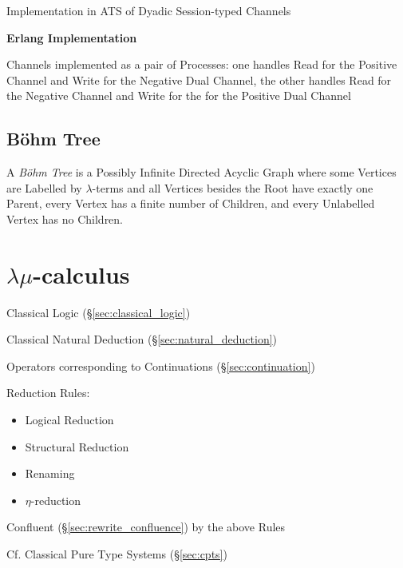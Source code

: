 Implementation in ATS of Dyadic Session-typed Channels


\textbf{Erlang Implementation}

Channels implemented as a pair of Processes: one handles Read for the
Positive Channel and Write for the Negative Dual Channel, the other
handles Read for the Negative Channel and Write for the for the
Positive Dual Channel %


\endgroup



\subsection{B\"ohm Tree}\label{sec:bohm_tree}

A \emph{B\"ohm Tree} is a Possibly Infinite Directed Acyclic Graph
where some Vertices are Labelled by $\lambda$-terms and all Vertices
besides the Root have exactly one Parent, every Vertex has a finite
number of Children, and every Unlabelled Vertex has no Children.



\section{$\lambda\mu$-calculus}\label{sec:lambda_mu}

Classical Logic (\S\ref{sec:classical_logic})

Classical Natural Deduction (\S\ref{sec:natural_deduction})

Operators corresponding to Continuations (\S\ref{sec:continuation})

Reduction Rules:
\begin{itemize}
  \item Logical Reduction
  \item Structural Reduction
  \item Renaming
  \item $\eta$-reduction
\end{itemize}

Confluent (\S\ref{sec:rewrite_confluence}) by the above Rules

\fist Cf. Classical Pure Type Systems (\S\ref{sec:cpts})


